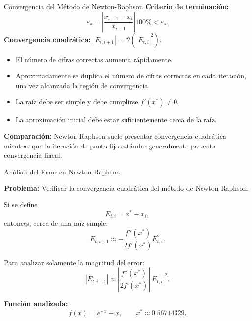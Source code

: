 \documentclass[../../main.tex]{subfiles}
\begin{document}

\begin{frame}{Convergencia del Método de Newton-Raphson}
\textbf{Criterio de terminación:}
\[
\varepsilon_a
=
\left|
\frac{x_{i+1}-x_i}{x_{i+1}}
\right|100\%
<
\varepsilon_s.
\]
\textbf{Convergencia cuadrática:}
\(
|E_{t,i+1}|
=
\mathcal{O}\left(|E_{t,i}|^2\right).
\)
\begin{itemize}
  \item El número de cifras correctas aumenta rápidamente.
  \item Aproximadamente se duplica el número de cifras correctas
        en cada iteración, una vez alcanzada la región de convergencia.
  \item La raíz debe ser simple y debe cumplirse \(f'(x^*)\neq0\).
  \item La aproximación inicial debe estar suficientemente cerca
        de la raíz.
\end{itemize}
\textbf{Comparación:}
Newton-Raphson suele presentar convergencia cuadrática, mientras
que la iteración de punto fijo estándar generalmente presenta
convergencia lineal.

\end{frame}



\begin{frame}{Análisis del Error en Newton-Raphson}

\textbf{Problema:}
Verificar la convergencia cuadrática del método de Newton-Raphson.

\vspace{0.5em}

Si se define
\[
E_{t,i}=x^*-x_i,
\]
entonces, cerca de una raíz simple,
\[
E_{t,i+1}
\approx
-\frac{f''(x^*)}{2f'(x^*)}E_{t,i}^2.
\]

Para analizar solamente la magnitud del error:
\[
|E_{t,i+1}|
\approx
\left|
\frac{f''(x^*)}{2f'(x^*)}
\right|
|E_{t,i}|^2.
\]

\textbf{Función analizada:}
\[
f(x)=e^{-x}-x,
\qquad
x^*\approx0.56714329.
\]

\end{frame}


\end{document}
